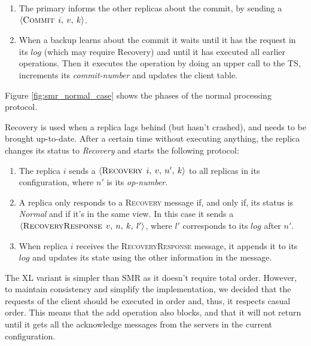 \documentclass[times, 10pt,twocolumn]{article}
\begin{document}
\begin{enumerate}
  \item The primary informs the other replicas about the commit, by sending a
  $\left \langle \textsc{Commit} \: \: i, \: v, \: k\right \rangle$.
  
  \item When a backup learns about the commit  it waits until it has the request in its 
  $log$ (which may require Recovery) and until it has executed all earlier operations.
  Then it executes the operation by doing an upper call to the TS, increments its \textit{commit-number}
  and updates the client table.
\end{enumerate}

Figure \ref{fig:smr_normal_case} shows the phases of the normal processing protocol.


 \label{smr_recovery}
Recovery is used when a replica lags behind (but hasn't crashed), and needs to be brought up-to-date. After a certain time without executing anything, the 
replica changes its status to \textit{Recovery} and starts the following protocol:

\begin{enumerate}
  \item The replica $i$ sends a $\left \langle \textsc{Recovery} \: \: i, \: v, \: n', \: k\right \rangle$
  to all replicas in its configuration, where $n'$ is its \textit{op-number}.
  
  \item A replica only responds to a \textsc{Recovery} message if, and only if, its status is \textit{Normal}
  and if it's in the same view. In this case it sends a 
  $\left \langle \textsc{RecoveryResponse} \: \: v, \: n, \: k, \: l'\right \rangle$, where 
  $l'$ corresponds to its $log$ after $n'$.
  
  \item When replica $i$ receives the \textsc{RecoveryResponse} message, it appends it to
  its $log$ and updates its state using the other information in the message.
\end{enumerate}
 \label{xl}
The XL variant is simpler than SMR as it doesn't require total order. However, to maintain
consistency and simplify the implementation, we decided that the requests of the client 
should be executed in order and, thus, it respects casual order. This means that the add 
operation also blocks, and that it will not return until it gets all the acknowledge messages from the servers 
in the current configuration.
\end{document}

